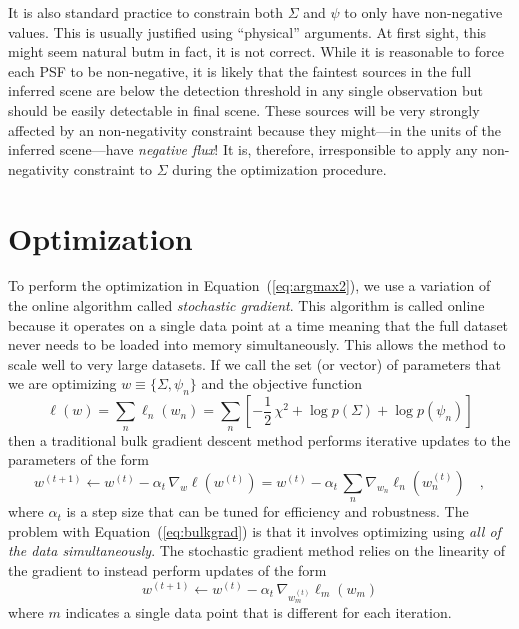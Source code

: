 \documentclass[12pt,preprint]{aastex}
\newcommand{\Eq}[1]{Equation~(\ref{eq:#1})}
\newcommand{\eq}[1]{\Eq{#1}}
\newcommand{\eqlabel}[1]{\label{eq:#1}}
\newcommand{\scene}{\ensuremath{\Sigma}}
\newcommand{\psf}{\ensuremath{\psi}}
\begin{document}
It is also standard practice to constrain both $\scene$ and $\psf$ to only
have non-negative values. This is usually justified using ``physical''
arguments. At first sight, this might seem natural butm in fact, it is not
correct. While it is reasonable to force each PSF to be non-negative, it
is likely that the faintest sources in the full inferred scene are
below the detection threshold in any single observation but should be
easily detectable in final scene. These sources will be very strongly
affected by an non-negativity constraint because they might---in the units
of the inferred scene---have \emph{negative flux}! It is, therefore,
irresponsible to apply any non-negativity constraint to $\scene$ during
the optimization procedure.

\section{Optimization}

To perform the optimization in \eq{argmax2}, we use a variation of the
online algorithm called \emph{stochastic gradient}. This algorithm is
called online because it operates on a single data point at a time
meaning that the full dataset never needs to be loaded into memory
simultaneously. This allows the method to scale well to very large
datasets. If we call the set (or vector) of parameters that we are
optimizing $w \equiv \{\scene, \psf_n\}$ and the objective function
\begin{equation}
    \ell (w) = \sum_n \ell_n (w_n) = \sum_n \left [ -\frac{1}{2} \, \chi^2
            + \log p (\scene) + \log p (\psf_n)
        \right ]
\end{equation}
then a traditional bulk
gradient descent method performs iterative updates to the parameters
of the form
\begin{equation}\eqlabel{bulkgrad}
    w^{(t+1)} \gets w^{(t)} - \alpha_t \, \nabla_w \ell (w^{(t)})
    = w^{(t)} - \alpha_t \, \sum_n \nabla_{w_n} \ell_n (w_n^{(t)}) \quad,
\end{equation}
where $\alpha_t$ is a step size that can be tuned for efficiency and
robustness. The problem with \eq{bulkgrad} is that it involves optimizing
using \emph{all of the data simultaneously}. The stochastic gradient
method relies on the linearity of the gradient to instead perform
updates of the form
\begin{equation}
    w^{(t+1)} \gets w^{(t)} - \alpha_t \, \nabla_{w_m^{(t)}}
        \ell_{m} (w_m)
\end{equation}
where $m$ indicates a single data point that is different for each
iteration.
\end{document}
